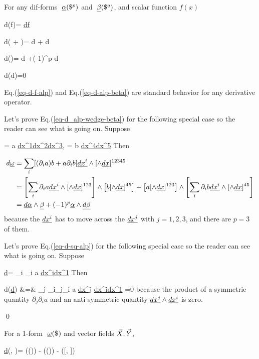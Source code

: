 \begin{claim}
For any dif-forms
$\pform{\alp}{p}$
and $\pform{\beta}{q}$,
and scalar function $f(x)$

\beq
d(f\ul{\alp})=
\ul{df}\wedge \ul{\alp}
\label{eq-d-f-alp}
\eeq

\beq
d(\ul{\alp} + \ul{\beta})=
d\ul{\alp} + d\ul{\beta}
\label{eq-d-alp-beta}
\eeq

\beq
d(\ul{\alp}\wedge \ul{\beta})=
d\ul{\alp}\wedge \ul{\beta}
+(-1)^{p}
\ul{\alp}\wedge d\ul{\beta}
\label{eq-d_alp-wedge-beta}
\eeq

\beq
d(d\ul{\alp})=0
\label{eq-d-sq-alp}
\eeq
\end{claim}
\proof

Eq.(\ref{eq-d-f-alp}) and Eq.(\ref{eq-d-alp-beta})
are standard behavior
for any derivative operator.

Let's prove Eq.(\ref{eq-d_alp-wedge-beta})
for the 
following special case so the reader can see
what is going on. Suppose

\beq
\ul{\alp}=
a \ul{dx^1}\wedge \ul{dx^2}\wedge\ul{dx^3},
\quad
\ul{\beta}=
b \ul{dx^4}\wedge \ul{dx^5}
\eeq
Then

\begin{align}
d\ul{\omega}
&=
\sum_i [(\partial_i a )
b+ a \partial_i b]
 \ul{dx^i}\wedge \wedgedx^{12345}
\\
&=
\left[
\sum_i 
\partial_i a
\ul{dx^i}\wedge
\wedgedx^{123}
\right]
\wedge
\left[
b\wedgedx^{45}
\right]
-
\left[
a
\wedgedx^{123}
\right]\wedge
\left[\sum_i \partial_i
b\ul{dx^i}\wedge
\wedgedx^{45}
\right]
\\
&=
\ul{d\alp}\wedge \ul{\beta}
+ (-1)^p\ul{\alp}
\wedge
\ul{d\beta}
\end{align}
because the $\ul{dx^i}$ has to move across  the  
$\ul{dx^j}$ with
$j=1,2,3$,
and there are $p=3$ of them.

Let's prove Eq.(\ref{eq-d-sq-alp})
for the 
following special case so the reader can see
what is going on. Suppose

\beq
\ul{d\omega}=
\sum_i \partial_i a
\ul{dx^i}\wedge \ul{dx^1}
\eeq
Then

\beqa
d(\ul{d\omega})
&=&
\sum_j \sum_i\partial_j\partial_i a
\ul{dx^j}\wedge
\ul{dx^i}\wedge \ul{dx^1}
=0
\eeqa
because the product
of a symmetric 
quantity
$\partial_j\partial_i a$ and
an anti-symmetric 
quantity 
$\ul{dx^j}\wedge
\ul{dx^i}$ is zero. 

\qed

\begin{claim}
For a 1-form $\pform{\omega}{}$
and vector fields ${\vec{X}}, {\vec{Y}}$,

\beq
\ul{d\omega}(\vecX, \vecY)= 
\vecX(\ul{\omega}(\vecY))
-
\vecY(\ul{\omega}(\vecX))
- \ul{\omega}
([\vecX, \vecY])
\eeq
\label{cl-d-1-form}
\end{claim}
\proof

